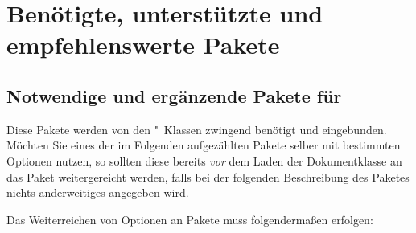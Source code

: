 \chapter{Benötigte, unterstützte und empfehlenswerte Pakete}
%
%
\section{Notwendige und ergänzende Pakete für \TUDScript}
%
Diese Pakete werden von den \TUDScript"~Klassen zwingend benötigt und 
eingebunden. Möchten Sie eines der im Folgenden aufgezählten Pakete selber 
mit bestimmten Optionen nutzen, so sollten diese bereits \emph{vor} dem Laden 
der Dokumentklasse an das Paket weitergereicht werden, falls bei der folgenden
Beschreibung des Paketes nichts anderweitiges angegeben wird.
%
\begin{Example}
Das Weiterreichen von Optionen an Pakete muss folgendermaßen erfolgen:
\end{Example}
%
